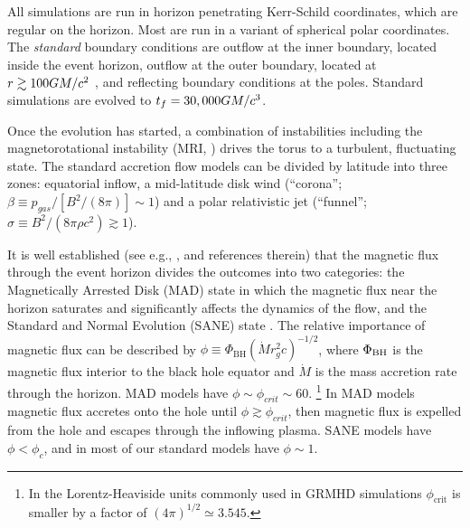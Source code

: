All simulations are run in horizon penetrating Kerr-Schild coordinates, which are regular on the horizon.  Most are run in a variant of spherical polar coordinates.  The {\em standard} boundary conditions are outflow at the inner boundary, located inside the event horizon, outflow at the outer boundary, located at $r \gtrsim 100 GM/c^2$ , and reflecting boundary conditions at the poles.  Standard  simulations are evolved to $t_f=30,000 GM/c^3$.

Once the evolution has started, a combination of instabilities including the magnetorotational instability (MRI, \citealt{1992ApJ...400..610B}) drives the torus to a turbulent, fluctuating state. The standard accretion flow models can be divided by  latitude into three zones: equatorial inflow, a mid-latitude disk wind (``corona''; $\beta \equiv p_{gas}/[B^2/(8\pi)] \sim 1$) and a polar relativistic jet (``funnel''; $\sigma \equiv B^2/(8\pi \rho c^2) \gtrsim 1$).

It is well established (see e.g., ,  and references therein) that the magnetic flux through the event horizon divides the outcomes into two categories: the Magnetically Arrested Disk (MAD) state \citep[e.g.,][]{1974Ap&SS..28...45B, Igumenschchev:2003, 2003PASJ...55L..69N} in which the magnetic flux near the horizon saturates and significantly affects the dynamics of the flow, and the Standard and Normal Evolution (SANE) state \citep[e.g.,][]{2003ApJ...589..444G, devilliers:2003, Narayan:2012}.  The relative importance of magnetic flux can be described by $\phi \equiv \Phi_{\mathrm{BH}} (\dot{M} r_g^2 c)^{-1/2}$, where $\Phi_{\rm BH}$ is the magnetic flux interior to the black hole equator and $\dot{M}$ is the mass accretion rate through the horizon. MAD models have $\phi \sim \phi_{crit} \sim 60$. \footnote{In the Lorentz-Heaviside units commonly used in GRMHD simulations $\phi_\mathrm{crit}$ is smaller by a factor of $(4\pi)^{1/2} \simeq 3.545$.}  In MAD models magnetic flux accretes onto the hole until $\phi \gtrsim \phi_{crit}$, then magnetic flux is expelled from the hole and escapes through the inflowing plasma.  SANE models have $\phi < \phi_c$, and in most of our standard models have $\phi \sim 1$.

